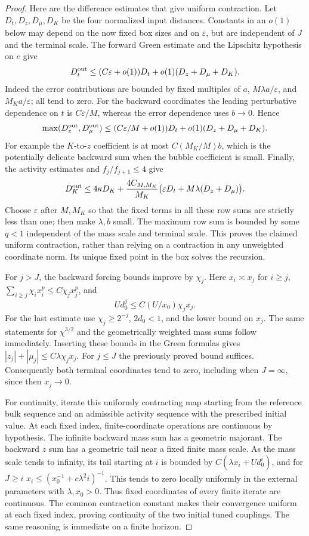 \documentclass[11pt]{article}
\begin{document}
\begin{proof}
Here are the difference estimates that give uniform contraction.
Let \(D_t,D_z,D_\mu,D_K\) be the four normalized input distances.
Constants in an \(o(1)\) below may depend on the now fixed box
sizes and on \(\varepsilon\), but are independent of \(J\)
and the terminal scale.  The forward Green estimate and the
Lipschitz hypothesis on \(e\) give
\[
 D_t^{\rm out}\le(C\varepsilon+o(1))D_t
                  +o(1)(D_z+D_\mu+D_K).
\]
Indeed the error contributions are bounded by fixed multiples of
\(a\), \(M\lambda a/\varepsilon\), and
\(M_Ka/\varepsilon\); all tend to zero.
For the backward coordinates the leading perturbative dependence on
\(t\) is \(C\varepsilon/M\), whereas the error dependence
uses \(b\to0\).  Hence
\[
 \max(D_z^{\rm out},D_\mu^{\rm out})
 \le(C\varepsilon/M+o(1))D_t
       +o(1)(D_z+D_\mu+D_K).
\]
For example the \(K\)-to-\(z\) coefficient is at most
\(C(M_K/M)b\), which is the potentially delicate backward
sum when the bubble coefficient is small.
Finally, the activity estimates and \(f_j/f_{j+1}\le4\) give
\[
 D_K^{\rm out}\le4\kappa D_K+
 \frac{4C_{M,M_K}}{M_K}
       \bigl(\varepsilon D_t+M\lambda(D_z+D_\mu)\bigr).
\]
Choose \(\varepsilon\) after \(M,M_K\) so that the fixed
terms in all these row sums are strictly less than one; then make
\(\lambda,b\) small.  The maximum row sum is bounded by some
\(q<1\) independent of the mass scale and terminal scale.
This proves the claimed uniform contraction, rather than relying
on a contraction in any unweighted coordinate norm.  Its unique
fixed point in the box solves the recursion.

For \(j>J\), the backward forcing bounds improve by \(\chi_j\).
Here \(x_i\asymp x_j\) for \(i\ge j\),
\(\sum_{i\ge j}\chi_i x_i^p\le C\chi_j x_j^p\), and
\[
 Ud_0^j\le C(U/x_0)\chi_j x_j.
\]
For the last estimate use \(\chi_j\ge2^{-j}\),
\(2d_0<1\), and the lower bound on \(x_j\).
The same statements for \(\chi^{3/2}\) and the geometrically
weighted mass sums follow immediately.  Inserting these bounds in
the Green formulas gives
\( |z_j|+|\mu_j|\le C\lambda\chi_j x_j\).
For \(j\le J\) the previously proved bound suffices.
Consequently both terminal coordinates tend to zero, including
when \(J=\infty\), since then \(x_j\to0\).

For continuity, iterate this uniformly contracting map starting
from the reference bulk sequence and an admissible activity
sequence with the prescribed initial value.  At each fixed index,
finite-coordinate operations are continuous by hypothesis.
The infinite backward mass sum has a geometric majorant.
The backward \(z\) sum has a geometric tail near a fixed finite
mass scale.  As the mass scale tends to infinity, its tail starting
at \(i\) is bounded by
\(C(\lambda x_i+Ud_0^i)\), and for \(J\ge i\)
\(x_i\le(x_0^{-1}+c\lambda^2i)^{-1}\).  This tends to zero
locally uniformly in the external parameters with \(\lambda,x_0>0\).
Thus fixed coordinates of every finite iterate are continuous.
The common contraction constant makes their convergence uniform
at each fixed index, proving continuity of the two initial tuned
couplings.  The same reasoning is immediate on a finite horizon.
\end{proof}
\end{document}
